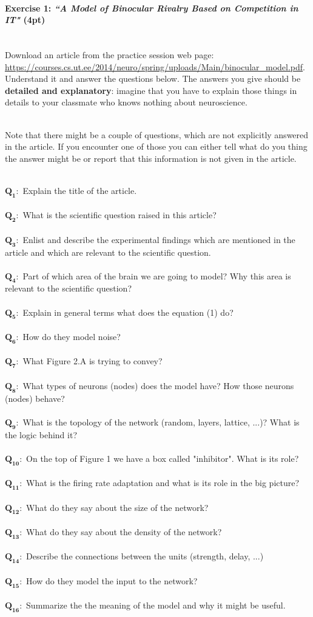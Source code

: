 \documentclass[a4paper,11pt]{article}
\newenvironment{exercise}[3]{\paragraph{Exercise #1: #2 (#3pt)}\ \\}{
\medskip}
\newcommand{\question}[2]{\setlength\parindent{0mm}\ \\$\mathbf{Q_{#1}:}$ #2\ \\}
\begin{document}
%
%
\begin{exercise}{1}{\textit{``A Model of Binocular Rivalry Based on Competition in IT"}}{4}
Download an article from the practice session web page: \url{https://courses.cs.ut.ee/2014/neuro/spring/uploads/Main/binocular_model.pdf}. Understand it and answer the questions below. The answers you give should be \textbf{detailed and explanatory}: imagine that you have to explain those things in details to your classmate who knows nothing about neuroscience.

\ \\
Note that there might be a couple of questions, which are not explicitly answered in the article. If you encounter one of those you can either tell what do you thing the answer might be or report that this information is not given in the article.

\question{1}{Explain the title of the article.}
\question{2}{What is the scientific question raised in this article?}
\question{3}{Enlist and describe the experimental findings which are mentioned in the article and which are relevant to the scientific question.}
\question{4}{Part of which area of the brain we are going to model? Why this area is relevant to the scientific question?}
\question{5}{Explain in general terms what does the equation (1) do?}
\question{6}{How do they model noise?}
\question{7}{What Figure 2.A is trying to convey?}
\question{8}{What types of neurons (nodes) does the model have? How those neurons (nodes) behave?}
\question{9}{What is the topology of the network (random, layers, lattice, ...)? What is the logic behind it?}
\question{10}{On the top of Figure 1 we have a box called "inhibitor". What is its role?}
\question{11}{What is the firing rate adaptation and what is its role in the big picture?}
\question{12}{What do they say about the size of the network?}
\question{13}{What do they say about the density of the network?}
\question{14}{Describe the connections between the units (strength, delay, ...)}
\question{15}{How do they model the input to the network?}
\question{16}{Summarize the the meaning of the model and why it might be useful.}

\end{exercise}
\end{document}

